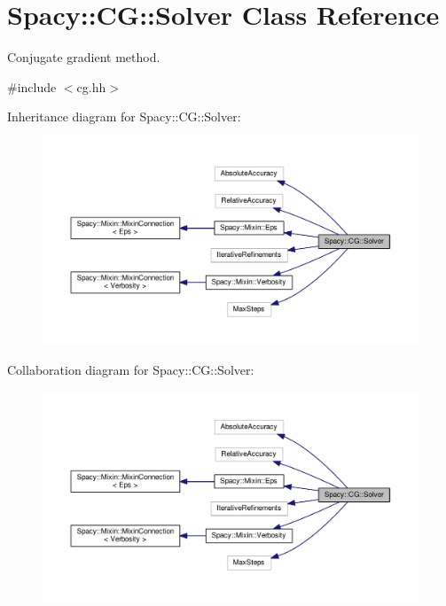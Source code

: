 \hypertarget{classSpacy_1_1CG_1_1Solver}{\section{Spacy\-:\-:C\-G\-:\-:Solver Class Reference}
\label{classSpacy_1_1CG_1_1Solver}
}


Conjugate gradient method.  




{\ttfamily \#include $<$cg.\-hh$>$}



Inheritance diagram for Spacy\-:\-:C\-G\-:\-:Solver\-:
\nopagebreak
\begin{figure}[H]
\begin{center}
\leavevmode
\includegraphics[width=350pt]{classSpacy_1_1CG_1_1Solver__inherit__graph}
\end{center}
\end{figure}


Collaboration diagram for Spacy\-:\-:C\-G\-:\-:Solver\-:
\nopagebreak
\begin{figure}[H]
\begin{center}
\leavevmode
\includegraphics[width=350pt]{classSpacy_1_1CG_1_1Solver__coll__graph}
\end{center}
\end{figure}
